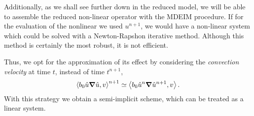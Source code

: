 \documentclass[../../thesis.tex]{subfiles}
\newcommand{\inner}[2]{\left<#1, #2\right>}
\begin{document}
Additionally, as we shall see further down in the reduced model, we will be able to assemble the reduced non-linear operator with the MDEIM procedure.
If for the evaluation of the nonlinear we used $u^{n+1}$, we would have a non-linear system which could be solved with a Newton-Rapshon iterative method.
Although this method is certainly the most robust, it is not efficient. 

Thus, we opt for the approximation of its effect by considering the \textit{convection velocity} at time $t$, instead of time $t^{n+1}$,
\begin{equation}
    \inner{b_0 \hat{u} \grad \hat{u}}{v}^{n+1} \simeq \inner{b_0 \hat{u}^{n} \grad \hat{u}^{n+1}}{v}.
\end{equation}
With this strategy we obtain a semi-implicit scheme, which can be treated as a linear system.
\end{document}
